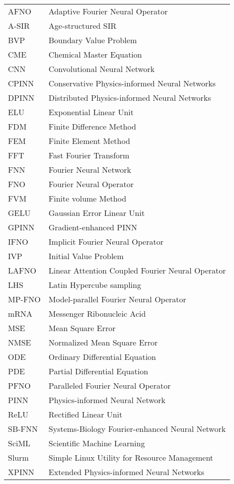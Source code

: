 \begin{tabular}{ll}
AFNO & Adaptive Fourier Neural Operator \\
A-SIR & Age-structured SIR \\
BVP & Boundary Value Problem \\
CME & Chemical Master Equation \\
CNN & Convolutional Neural Network \\
CPINN & Conservative Physics-informed Neural Networks \\
DPINN & Distributed Physics-informed Neural Networks \\
ELU & Exponential Linear Unit \\
FDM & Finite Difference Method \\
FEM & Finite Element Method \\
FFT & Fast Fourier Transform \\
FNN & Fourier Neural Network \\
FNO & Fourier Neural Operator \\
FVM & Finite volume Method \\
GELU & Gaussian Error Linear Unit \\
GPINN & Gradient-enhanced PINN \\
IFNO & Implicit Fourier Neural Operator \\
IVP & Initial Value Problem \\
LAFNO & Linear Attention Coupled Fourier Neural Operator \\
LHS & Latin Hypercube sampling \\
MP-FNO & Model-parallel Fourier Neural Operator \\
mRNA & Messenger Ribonucleic Acid \\
MSE & Mean Square Error \\
NMSE & Normalized Mean Square Error \\
ODE & Ordinary Differential Equation \\
PDE & Partial Differential Equation \\
PFNO & Paralleled Fourier Neural Operator \\
PINN & Physics-informed Neural Network \\
ReLU & Rectified Linear Unit \\
SB-FNN & Systems-Biology Fourier-enhanced Neural Network \\
SciML & Scientific Machine Learning \\
Slurm & Simple Linux Utility for Resource Management \\
XPINN & Extended Physics-informed Neural Networks \\
\end{tabular}
